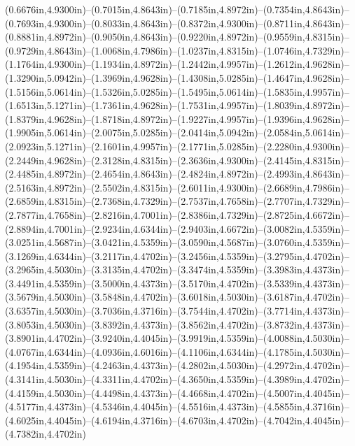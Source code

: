 (0.6676in,4.9300in)--(0.7015in,4.8643in)--(0.7185in,4.8972in)--(0.7354in,4.8643in)--(0.7693in,4.9300in)--(0.8033in,4.8643in)--(0.8372in,4.9300in)--(0.8711in,4.8643in)--(0.8881in,4.8972in)--(0.9050in,4.8643in)--(0.9220in,4.8972in)--(0.9559in,4.8315in)--(0.9729in,4.8643in)--(1.0068in,4.7986in)--(1.0237in,4.8315in)--(1.0746in,4.7329in)--(1.1764in,4.9300in)--(1.1934in,4.8972in)--(1.2442in,4.9957in)--(1.2612in,4.9628in)--(1.3290in,5.0942in)--(1.3969in,4.9628in)--(1.4308in,5.0285in)--(1.4647in,4.9628in)--(1.5156in,5.0614in)--(1.5326in,5.0285in)--(1.5495in,5.0614in)--(1.5835in,4.9957in)--(1.6513in,5.1271in)--(1.7361in,4.9628in)--(1.7531in,4.9957in)--(1.8039in,4.8972in)--(1.8379in,4.9628in)--(1.8718in,4.8972in)--(1.9227in,4.9957in)--(1.9396in,4.9628in)--(1.9905in,5.0614in)--(2.0075in,5.0285in)--(2.0414in,5.0942in)--(2.0584in,5.0614in)--(2.0923in,5.1271in)--(2.1601in,4.9957in)--(2.1771in,5.0285in)--(2.2280in,4.9300in)--(2.2449in,4.9628in)--(2.3128in,4.8315in)--(2.3636in,4.9300in)--(2.4145in,4.8315in)--(2.4485in,4.8972in)--(2.4654in,4.8643in)--(2.4824in,4.8972in)--(2.4993in,4.8643in)--(2.5163in,4.8972in)--(2.5502in,4.8315in)--(2.6011in,4.9300in)--(2.6689in,4.7986in)--(2.6859in,4.8315in)--(2.7368in,4.7329in)--(2.7537in,4.7658in)--(2.7707in,4.7329in)--(2.7877in,4.7658in)--(2.8216in,4.7001in)--(2.8386in,4.7329in)--(2.8725in,4.6672in)--(2.8894in,4.7001in)--(2.9234in,4.6344in)--(2.9403in,4.6672in)--(3.0082in,4.5359in)--(3.0251in,4.5687in)--(3.0421in,4.5359in)--(3.0590in,4.5687in)--(3.0760in,4.5359in)--(3.1269in,4.6344in)--(3.2117in,4.4702in)--(3.2456in,4.5359in)--(3.2795in,4.4702in)--(3.2965in,4.5030in)--(3.3135in,4.4702in)--(3.3474in,4.5359in)--(3.3983in,4.4373in)--(3.4491in,4.5359in)--(3.5000in,4.4373in)--(3.5170in,4.4702in)--(3.5339in,4.4373in)--(3.5679in,4.5030in)--(3.5848in,4.4702in)--(3.6018in,4.5030in)--(3.6187in,4.4702in)--(3.6357in,4.5030in)--(3.7036in,4.3716in)--(3.7544in,4.4702in)--(3.7714in,4.4373in)--(3.8053in,4.5030in)--(3.8392in,4.4373in)--(3.8562in,4.4702in)--(3.8732in,4.4373in)--(3.8901in,4.4702in)--(3.9240in,4.4045in)--(3.9919in,4.5359in)--(4.0088in,4.5030in)--(4.0767in,4.6344in)--(4.0936in,4.6016in)--(4.1106in,4.6344in)--(4.1785in,4.5030in)--(4.1954in,4.5359in)--(4.2463in,4.4373in)--(4.2802in,4.5030in)--(4.2972in,4.4702in)--(4.3141in,4.5030in)--(4.3311in,4.4702in)--(4.3650in,4.5359in)--(4.3989in,4.4702in)--(4.4159in,4.5030in)--(4.4498in,4.4373in)--(4.4668in,4.4702in)--(4.5007in,4.4045in)--(4.5177in,4.4373in)--(4.5346in,4.4045in)--(4.5516in,4.4373in)--(4.5855in,4.3716in)--(4.6025in,4.4045in)--(4.6194in,4.3716in)--(4.6703in,4.4702in)--(4.7042in,4.4045in)--(4.7382in,4.4702in)

